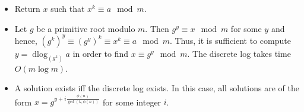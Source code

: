 \begin{itemize}
	\item Return $x$ such that $x^k \equiv a \mod m$.
	\item Let $g$ be a primitive root modulo $m$. Then $g^y \equiv x \mod m$ for some $y$ and hence, $\left(g^k\right)^y \equiv \left(g^{y}\right)^k \equiv x^k \equiv a \mod m$. Thus, it is sufficient to compute $y = \operatorname{dlog}_{(g^k)}a$ in order to find $x \equiv g^y \mod m$. The discrete log takes time $O\left(m \log m\right)$.
	\item A solution exists iff the discrete log exists. In this case, all solutions are of the form $x = g^{y + i\frac{ \phi \left(n\right)}{\gcd\left(k,  \phi \left(n\right)\right)}}$ for some integer $i$.
\end{itemize}